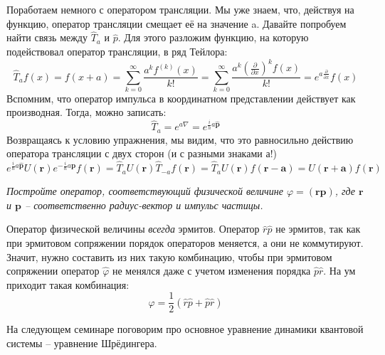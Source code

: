 Поработаем немного с оператором трансляции. Мы уже знаем, что, действуя на функцию, оператор трансляции смещает её на значение a. Давайте попробуем найти связь между $\hat T_{a}$ и $\hat{p}$. Для этого разложим функцию, на которую подействовал оператор трансляции, в ряд Тейлора:
\[
\hat T_{a} f(x) = f(x + a) = \sum\limits_{k=0}^{\infty} \frac{a^k f^{(k)}(x)}{k!} = \sum\limits_{k=0}^{\infty} \frac{a^k (\frac{\partial}{\partial x})^k f(x)}{k!} = e^{a \frac{\partial}{\partial x}} f(x)
\]
Вспомним, что оператор импульса в координатном представлении действует как производная. Тогда, можно записать:
\[
\hat T_{a} = e^{a\nabla} = e^{\frac{i}{h}a\hat{\mathbf{p}}}
\]
Возвращаясь к условию упражнения, мы видим, что это равносильно действию оператора трансляции с двух сторон (и с разными знаками а!)
\[
e^{\frac{i}{\hbar} a \hat{\mathbf{p}}} U(\mathbf{r}) e^{-\frac{i}{\hbar} a \hat{\mathbf{p}}} f(\mathbf{r}) = \hat T_{a} U(\mathbf{r}) \hat T_{-a} f(\mathbf{r}) = \hat T_{a}U(\mathbf{r}) f(\mathbf{r - a}) = U(\mathbf{r + a}) f(\mathbf{r})
\]
\begin{center}
\textit{Постройте оператор, соответствующий физической величине $\varphi = (\mathbf{rp})$, где $\mathbf r$ и $\mathbf p$ -- соответственно радиус-вектор и импульс частицы.}
\end{center}

Оператор физической величины \textit{всегда} эрмитов. Оператор $\hat{r}\hat{p}$ не эрмитов, так как при эрмитовом сопряжении порядок операторов меняется, а они не коммутируют. Значит, нужно составить из них такую комбинацию, чтобы при эрмитовом сопряжении оператор $\hat{\varphi}$ не менялся даже с учетом изменения порядка $\hat{p} \hat{r}$. На ум приходит такая комбинация:
\[
\hat{\varphi} = \frac{1}{2} (\hat{r} \hat{p} + \hat{p} \hat{r})
\]

На следующем семинаре поговорим про основное уравнение динамики квантовой системы -- уравнение Шрёдингера.